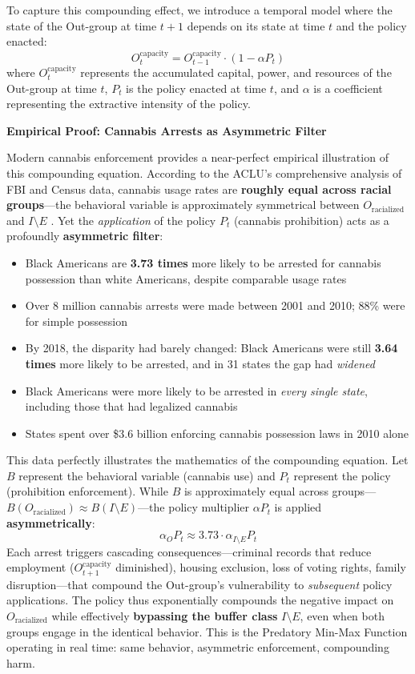 \documentclass[12pt,openany]{book}
\begin{document}
To capture this compounding effect, we introduce a temporal model where the state of the Out-group at time $t+1$ depends on its state at time $t$ and the policy enacted:
\[
O_t^{\text{capacity}} = O_{t-1}^{\text{capacity}} \cdot (1 - \alpha P_t)
\]
where $O_t^{\text{capacity}}$ represents the accumulated capital, power, and resources of the Out-group at time $t$, $P_t$ is the policy enacted at time $t$, and $\alpha$ is a coefficient representing the extractive intensity of the policy.

\textbf{Empirical Proof: Cannabis Arrests as Asymmetric Filter}

Modern cannabis enforcement provides a near-perfect empirical illustration of this compounding equation. According to the ACLU's comprehensive analysis of FBI and Census data, cannabis usage rates are \textbf{roughly equal across racial groups}---the behavioral variable is approximately symmetrical between $O_{\text{racialized}}$ and $I \setminus E$ \cite{aclu2013}. Yet the \textit{application} of the policy $P_t$ (cannabis prohibition) acts as a profoundly \textbf{asymmetric filter}:

\begin{itemize}
    \item Black Americans are \textbf{3.73 times} more likely to be arrested for cannabis possession than white Americans, despite comparable usage rates \cite{aclu2013}
    \item Over 8 million cannabis arrests were made between 2001 and 2010; 88\% were for simple possession
    \item By 2018, the disparity had barely changed: Black Americans were still \textbf{3.64 times} more likely to be arrested, and in 31 states the gap had \textit{widened} \cite{aclu2020}
    \item Black Americans were more likely to be arrested in \textit{every single state}, including those that had legalized cannabis
    \item States spent over \$3.6 billion enforcing cannabis possession laws in 2010 alone
\end{itemize}

This data perfectly illustrates the mathematics of the compounding equation. Let $B$ represent the behavioral variable (cannabis use) and $P_t$ represent the policy (prohibition enforcement). While $B$ is approximately equal across groups---$B(O_{\text{racialized}}) \approx B(I \setminus E)$---the policy multiplier $\alpha P_t$ is applied \textbf{asymmetrically}:
\[
\alpha_{O} P_t \approx 3.73 \cdot \alpha_{I \setminus E} P_t
\]
Each arrest triggers cascading consequences---criminal records that reduce employment ($O_{t+1}^{\text{capacity}}$ diminished), housing exclusion, loss of voting rights, family disruption---that compound the Out-group's vulnerability to \textit{subsequent} policy applications. The policy thus exponentially compounds the negative impact on $O_{\text{racialized}}$ while effectively \textbf{bypassing the buffer class} $I \setminus E$, even when both groups engage in the identical behavior. This is the Predatory Min-Max Function operating in real time: same behavior, asymmetric enforcement, compounding harm.
\end{document}
